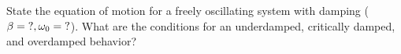 

\vspace*{\fill}
\centering

State the equation of motion for a freely oscillating system with damping ($\beta = {\rm ?},\omega_{0} = {\rm ?}$). What are the conditions for an underdamped, critically damped, and overdamped behavior?

\centering
\vspace*{\fill}

